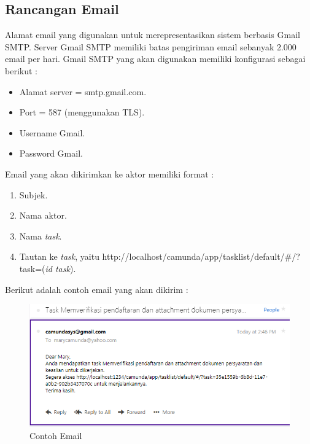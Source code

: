 \subsection{Rancangan Email}
\label{Rancangansistem_rancanganemail}
Alamat email yang digunakan untuk merepresentasikan sistem berbasis Gmail SMTP. Server Gmail SMTP memiliki batas pengiriman email sebanyak 2.000 email per hari. Gmail SMTP yang akan digunakan memiliki konfigurasi sebagai berikut \cite{smtpgoogle} :
\begin{itemize}
	\item Alamat server = smtp.gmail.com.
	\item Port = 587 (menggunakan TLS).
	\item Username Gmail.
	\item Password Gmail.
\end{itemize}
Email yang akan dikirimkan ke aktor memiliki format :
\begin{enumerate}
	\item Subjek.
	\item Nama aktor.
	\item Nama \textit{task}.
	\item Tautan ke \textit{task}, yaitu http://localhost/camunda/app/tasklist/default/\#/?task=(\textit{id task}).
\end{enumerate}
Berikut adalah contoh email yang akan dikirim :
			\begin{figure}[H]
			\centering
			\includegraphics[scale=0.8]{Gambar/Bab-5/kasus2/12}
			\caption{Contoh Email} 
			\label{fig:perancangan_contohemail}
	\end{figure}
 

